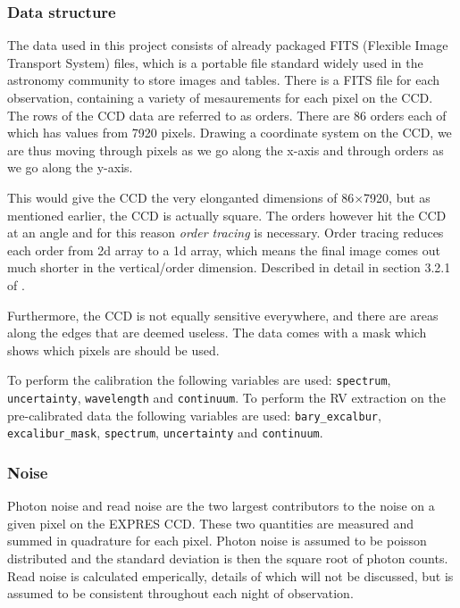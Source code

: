 
\subsubsection{Data structure}
The data used in this project consists of already packaged FITS (Flexible Image Transport System) files, which is a portable file standard widely used in the astronomy community to store images and tables. There is a FITS file for each observation, containing a variety of mesaurements for each pixel on the CCD. 
The rows of the CCD data are referred to as orders. There are 86 orders each of which has values from 7920 pixels. Drawing a coordinate system on the CCD, we are thus moving through pixels as we go along the x-axis and through orders as we go along the y-axis.

This would give the CCD the very elonganted dimensions of 86$\times$7920, but as mentioned earlier, the CCD is actually square. The orders however hit the CCD at an angle and for this reason \emph{order tracing} is necessary. Order tracing reduces each order from 2d array to a 1d array, which means the final image comes out much shorter in the vertical/order dimension. Described in detail in section 3.2.1 of \cite{first_RV_from_EXPRES}.

Furthermore, the CCD is not equally sensitive everywhere, and there are areas along the edges that are deemed useless. The data comes with a mask which shows which pixels are should be used. 

To perform the calibration the following variables are used: \verb|spectrum|, \verb|uncertainty|, \verb|wavelength| and \verb|continuum|. To perform the RV extraction on the pre-calibrated data the following variables are used: \verb|bary_excalbur|, 
\verb|excalibur_mask|, \verb|spectrum|, \verb|uncertainty| and \verb|continuum|.

\subsubsection{Noise}
Photon noise and read noise are the two largest contributors to the noise on a given pixel on the EXPRES CCD. These two quantities are measured and summed in quadrature for each pixel. Photon noise is assumed to be poisson distributed and the standard deviation is then the square root of photon counts. Read noise is calculated emperically, details of which will not be discussed, but is assumed to be consistent throughout each night of observation. 

